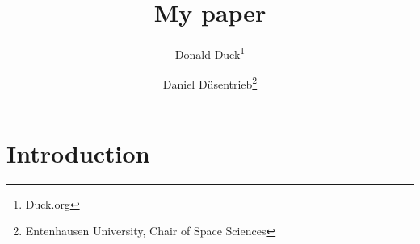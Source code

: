\documentclass[12pt,ngerman]{article}
\title{My paper}
\author{Donald Duck\footnote{Duck.org} \and Daniel Düsentrieb\footnote{Entenhausen University, Chair of Space Sciences}}
\begin{document}
\maketitle

\begin{abstract}
\blindtext
\end{abstract}

\section{Introduction}

\blindtext
\end{document}
